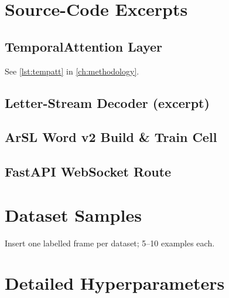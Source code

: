 \chapter{Source-Code Excerpts}
\label{app:code}

\section{TemporalAttention Layer}
\label{app:code:att}

See \cref{lst:tempatt} in \cref{ch:methodology}.

\section{Letter-Stream Decoder (excerpt)}
\label{app:code:dec}


\section{ArSL Word v2 Build \& Train Cell}
\label{app:code:trainv2}


\section{FastAPI WebSocket Route}
\label{app:code:ws}


\chapter{Dataset Samples}
\label{app:samples}

Insert one labelled frame per dataset; 5--10 examples each.

\chapter{Detailed Hyperparameters}
\label{app:hparams}

